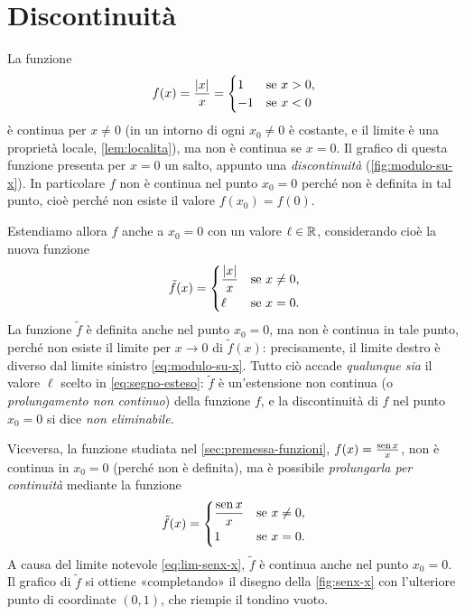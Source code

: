 \section{Discontinuità}
\label{sec:discontinuita}

La funzione
\begin{equation}\label{eq:segno}
  f(x)=\frac{\lvert x\rvert}{x}=
  \begin{cases}
    1 & \text{se } x>0,\\
    -1 & \text{se } x<0
  \end{cases}
\end{equation}
è continua per $x\neq0$ (in un intorno di ogni $x_{0}\neq0$ è costante, e il limite è
una proprietà locale, \cref{lem:localita}), ma non è continua se $x=0$. Il grafico di
questa funzione presenta per $x=0$ un salto, appunto una \emph{discontinuità}
(\cref{fig:modulo-su-x}). In particolare $f$ non è continua nel punto $x_{0}=0$ perché
non è definita in tal punto, cioè perché non esiste il valore $f(x_{0})=f(0)$.

Estendiamo allora $f$ anche a $x_{0}=0$ con un valore $\ell\in\mathbb{R}$, considerando cioè la
nuova funzione
\begin{equation}\label{eq:segno-esteso}
  \tilde f(x)=
  \begin{cases}
    \dfrac{\lvert x\rvert}{x} & \text{se } x\neq0,\\[1ex]
    \ell & \text{se } x=0 .
  \end{cases}
\end{equation}
La funzione $\tilde f$ è definita anche nel punto $x_{0}=0$, ma non è continua in tale
punto, perché non esiste il limite per $x\to0$ di $\tilde f(x)$: precisamente, il limite
destro è diverso dal limite sinistro \eqref{eq:modulo-su-x}. Tutto ciò accade
\emph{qualunque sia} il valore $\ell$ scelto in \eqref{eq:segno-esteso}: $\tilde f$ è
un'estensione non continua (o \emph{prolungamento non continuo}) della funzione $f$, e
la discontinuità di $f$ nel punto $x_{0}=0$ si dice \emph{non eliminabile}.

Viceversa, la funzione studiata nel \cref{sec:premessa-funzioni},
$f(x)=\frac{\operatorname{sen} x}{x}$, non è continua in $x_{0}=0$ (perché non è definita), ma è
possibile \emph{prolungarla per continuità} mediante la funzione
\begin{equation}\label{eq:sinc}
  \tilde f(x)=
  \begin{cases}
    \dfrac{\operatorname{sen} x}{x} & \text{se } x\neq0,\\[1ex]
    1 & \text{se } x=0 .
  \end{cases}
\end{equation}
A causa del limite notevole \eqref{eq:lim-senx-x}, $\tilde f$ è continua anche nel punto
$x_{0}=0$. Il grafico di $\tilde f$ si ottiene «completando» il disegno della
\cref{fig:senx-x} con l'ulteriore punto di coordinate $(0,1)$, che riempie il tondino
vuoto.

